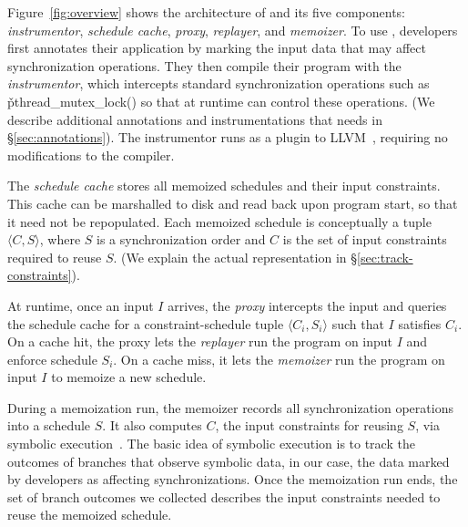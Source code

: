 Figure~\ref{fig:overview} shows the architecture of \tern and its five
components: \emph{instrumentor}, \emph{schedule cache}, \emph{proxy},
\emph{replayer}, and \emph{memoizer}.  To use \tern, developers first
annotates their application by marking the input data that may affect
synchronization operations.  They then compile their program with the
\emph{instrumentor}, which intercepts standard synchronization operations
such as \v{pthread\_mutex\_lock()} so that at runtime \tern can control
these operations.  (We describe additional annotations and
instrumentations that \tern needs in \S\ref{sec:annotations}).  The
instrumentor runs as a plugin to LLVM~\cite{llvm}, requiring no
modifications to the compiler.



The \emph{schedule cache} stores all memoized schedules and their input
constraints.  This cache can be marshalled to disk and read back upon
program start, so that it need not be repopulated.
Each memoized schedule
is conceptually a tuple $\langle C, S \rangle$, where $S$ is a
synchronization order and $C$ is the set of input constraints required to reuse
$S$. (We explain the actual representation in
\S\ref{sec:track-constraints}).

At runtime, once an input $I$ arrives, the \emph{proxy} intercepts the
input and queries the schedule cache for a constraint-schedule tuple
$\langle C_i, S_i \rangle$ such that $I$ satisfies $C_i$.  On a cache hit,
the proxy lets the \emph{replayer} run the program on input $I$ and enforce
schedule $S_i$.  On a cache miss, it lets the \emph{memoizer} run the
program on input $I$ to memoize a new schedule.

During a memoization run, the memoizer records all synchronization
operations into a schedule $S$.  It also computes $C$, the input
constraints for reusing $S$, via symbolic execution~\cite{klee:osdi08}.
The basic idea of symbolic execution is to track the outcomes of branches
that observe symbolic data, in our case, the data marked by developers as
affecting synchronizations.  Once the memoization run ends, the set of
branch outcomes we collected describes the input constraints needed to reuse
the memoized schedule.

